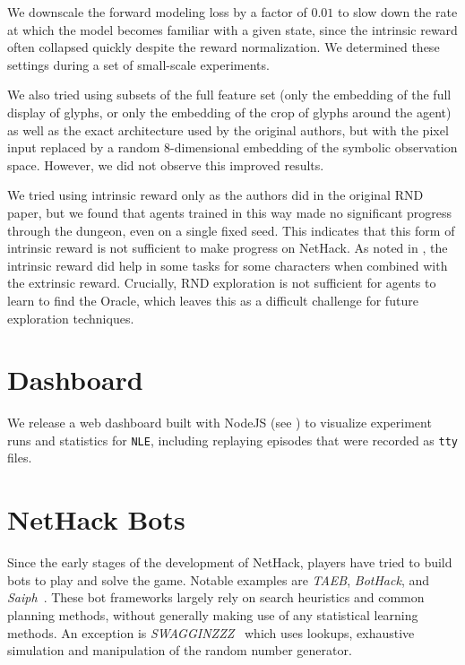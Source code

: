 \documentclass{article}
\newcommand{\NLE}{\texttt{NLE}}
\begin{document}
We downscale the forward modeling loss by a factor of $0.01$ to slow down the rate at which the model becomes familiar with a given state, since the intrinsic reward often collapsed quickly despite the reward normalization.
We determined these settings during a set of small-scale experiments.

We also tried using subsets of the full feature set (only the embedding of the full display of glyphs, or only the embedding of the crop of glyphs around the agent) as well as the exact architecture used by the original authors, but with the pixel input replaced by a random $8$-dimensional embedding of the symbolic observation space. However, we did not observe this improved results.

We tried using intrinsic reward only as the authors did in the original RND paper, but we found that agents trained in this way made no significant progress through the dungeon, even on a single fixed seed. This indicates that this form of intrinsic reward is not sufficient to make progress on NetHack.
As noted in , the intrinsic reward did help in some tasks for some characters when combined with the extrinsic reward. Crucially, RND exploration is not sufficient for agents to learn to find the Oracle, which leaves this as a difficult challenge for future exploration techniques.


\section{Dashboard}
\label{sec:dashboard}
We release a web dashboard built with NodeJS (see ) to visualize experiment runs and statistics for \NLE{}, including replaying episodes that were recorded as \texttt{tty} files.

\section{NetHack Bots}
\label{sec:bots}
Since the early stages of the development of NetHack, players have tried to build bots to play and solve the game.
Notable examples are \emph{TAEB}, \emph{BotHack}, and
\emph{Saiph}~\citep{taebwikibots, nhwiki}. These bot frameworks largely rely on search heuristics and common planning methods, without generally making use of any statistical learning methods. An exception is \emph{SWAGGINZZZ}~\citep{swagginzzz} which uses lookups, exhaustive simulation and manipulation of the random number generator.
\end{document}
